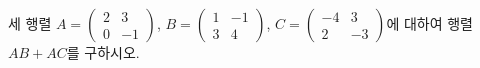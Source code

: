세 행렬 $A=\begin{pmatrix} 2 & 3 \\ 0 & -1 \end{pmatrix}$, $B=\begin{pmatrix} 1 & -1 \\ 3 & 4 \end{pmatrix}$, $C=\begin{pmatrix} -4 & 3 \\ 2 & -3 \end{pmatrix}$에 대하여 행렬 $AB+AC$를 구하시오.
